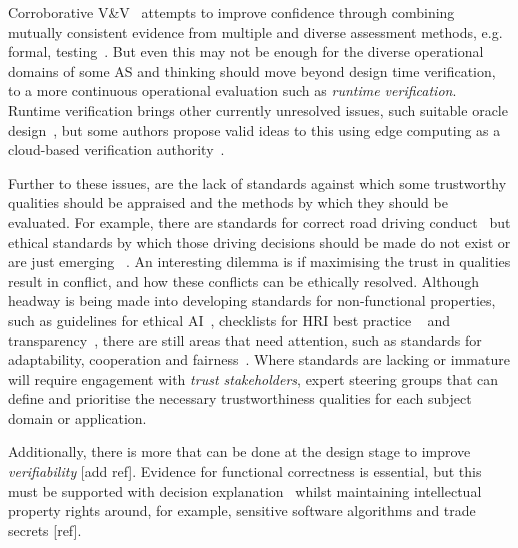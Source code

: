 
Corroborative V\&V~\cite{webster2020corroborative} attempts to improve confidence through combining mutually consistent evidence from multiple and diverse assessment methods, e.g. formal, testing~\cite{schwamm2022}. 
%
But even this may not be enough for the diverse operational domains of some AS and thinking should move beyond design time verification, to a more continuous operational evaluation such as \emph{runtime verification}. Runtime verification brings other currently unresolved issues, such suitable oracle design~\cite{Leucker2009}, but some authors propose valid ideas to this using edge computing as a cloud-based verification authority~\cite{CyRes20,eder2021cyres}. 
%

Further to these issues, are the lack of standards against which some trustworthy qualities should be appraised and the methods by which they should be evaluated. For example, there are standards for correct road driving conduct~\cite{highwayCode} but ethical standards by which those driving decisions should be made do not exist or are just emerging~\cite{Bonnefon2016} . 
%
An interesting dilemma is if maximising the trust in qualities result in conflict, and how these conflicts can be ethically resolved. 
%
Although headway is being made into developing standards for non-functional properties, such as guidelines for ethical AI~\cite{Floridi2018}, checklists for HRI best practice ~\cite{kraus2022trustworthy} and transparency~\cite{winfield2021ieee}, there are still areas that need attention, such as standards for adaptability, cooperation and fairness~\cite{Abeywickrama2022}. 
%
Where standards are lacking or immature will require engagement with \emph{trust stakeholders}, expert steering groups that can define and prioritise the necessary trustworthiness qualities for each subject domain or application. 

Additionally, there is more that can be done at the design stage to improve \emph{verifiability} [add ref]. Evidence for functional correctness is essential, but this must be supported with decision explanation~\cite{koopman2018toward} whilst maintaining intellectual property rights around, for example, sensitive software algorithms and trade secrets [ref]. 

